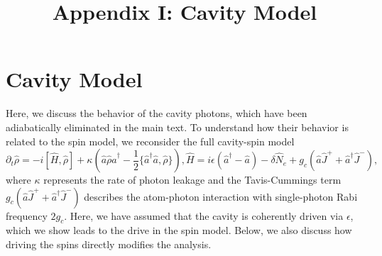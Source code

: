 \documentclass[11pt]{article}
\title{Appendix I: Cavity Model}
\author{}
\date{}
\begin{document}
\maketitle


\section{Cavity Model}
\label{sec:cavity}

Here, we discuss the behavior of the cavity photons, which have been adiabatically eliminated in the main text. To understand how their behavior is related to the spin model, we reconsider the full cavity-spin model
\begin{subequations}
\begin{equation}
    \partial_t \hat \rho = -i [\hat H, \hat \rho] + \kappa (\hat a \hat \rho \hat a^\dagger - \frac{1}{2} \{ \hat a^\dagger \hat a, \hat \rho \}),
\end{equation}
\begin{equation}
    \hat H = i \epsilon (\hat a^\dagger - \hat a) - \delta \hat N_e + g_c (\hat a \hat J^+ + \hat a^\dagger \hat J^-),
\end{equation}
\end{subequations}
where $\kappa$ represents the rate of photon leakage and the Tavis-Cummings term $g_c (\hat a \hat J^+ + \hat a^\dagger \hat J^-)$ describes the atom-photon interaction with single-photon Rabi frequency $2 g_c$. Here, we have assumed that the cavity is coherently driven via $\epsilon$, which we show leads to the drive in the spin model. Below, we also discuss how driving the spins directly modifies the analysis.
\end{document}
